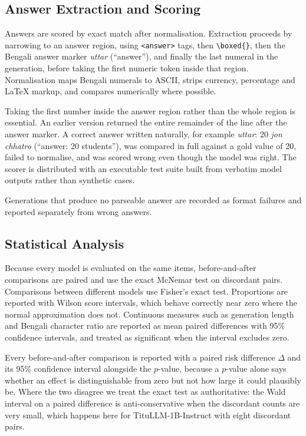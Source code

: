 \subsection{Answer Extraction and Scoring}

Answers are scored by exact match after normalisation. Extraction proceeds by
narrowing to an answer region, using \texttt{<answer>} tags, then
\texttt{\textbackslash boxed\{\}}, then the Bengali answer marker \emph{uttar}
(``answer''), and finally the last numeral in the generation, before taking the
first numeric token inside that region. Normalisation maps Bengali numerals
to ASCII, strips currency, percentage and LaTeX markup, and compares numerically
where possible.

Taking the first number inside the answer region rather than the whole region is
essential. An earlier version returned the entire remainder of the line after
the answer marker. A correct answer written naturally, for example
\emph{uttar}: 20 \emph{jon chhatro} (``answer: 20 students''), was compared in
full against a gold value of 20, failed to normalise, and was scored wrong even
though the model was right. The scorer is distributed with an executable
test suite built from verbatim model outputs rather than synthetic cases.

Generations that produce no parseable answer are recorded as format failures and
reported separately from wrong answers.

\subsection{Statistical Analysis}

Because every model is evaluated on the same items, before-and-after comparisons
are paired and use the exact McNemar test on discordant pairs. Comparisons
between different models use Fisher's exact test. Proportions are reported with
Wilson score intervals, which behave correctly near zero where the normal
approximation does not. Continuous measures such as generation length and
Bengali character ratio are reported as mean paired differences with 95\%
confidence intervals, and treated as significant when the interval excludes
zero.

Every before-and-after comparison is reported with a paired risk difference
$\Delta$ and its 95\% confidence interval alongside the $p$-value, because a
$p$-value alone says whether an effect is distinguishable from zero but not how
large it could plausibly be. Where the two disagree we treat the exact test as
authoritative: the Wald interval on a paired difference is anti-conservative
when the discordant counts are very small, which happens here for
TituLLM-1B-Instruct with eight discordant pairs.

